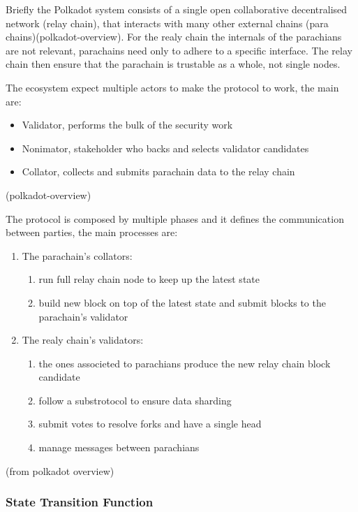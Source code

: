 \documentclass[../main.tex]{subfiles}
\begin{document}
Briefly the Polkadot system consists of a single open collaborative decentralised network (relay chain), that interacts with many other external chains (para chains)(polkadot-overview). For the realy chain the internals of the parachians are not relevant, parachains need only to adhere to a specific interface. The relay chain then ensure that the parachain is trustable as a whole, not single nodes.

The ecosystem expect multiple actors to make the protocol to work, the main are:
\begin{itemize}
  \item Validator, performs the bulk of the security work
  \item Nonimator, stakeholder who backs and selects validator candidates
  \item Collator, collects and submits parachain data to the relay chain
\end{itemize}
(polkadot-overview)

The protocol is composed by multiple phases and it defines the communication between parties, the main processes are:

\begin{enumerate}
  \item The parachain's collators:
        \begin{enumerate}
                \item run full relay chain node to keep up the latest state
                \item build new block on top of the latest state and submit blocks to the parachain's validator
        \end{enumerate}
  \item The realy chain's validators:
    \begin{enumerate}
      \item the ones associeted to parachians produce the new relay chain block candidate
      \item follow a substrotocol to ensure data sharding
      \item submit votes to resolve forks and have a single head
      \item manage messages between parachians
    \end{enumerate}
\end{enumerate}
(from polkadot overview)

\subsubsection{State Transition Function}
\end{document}
